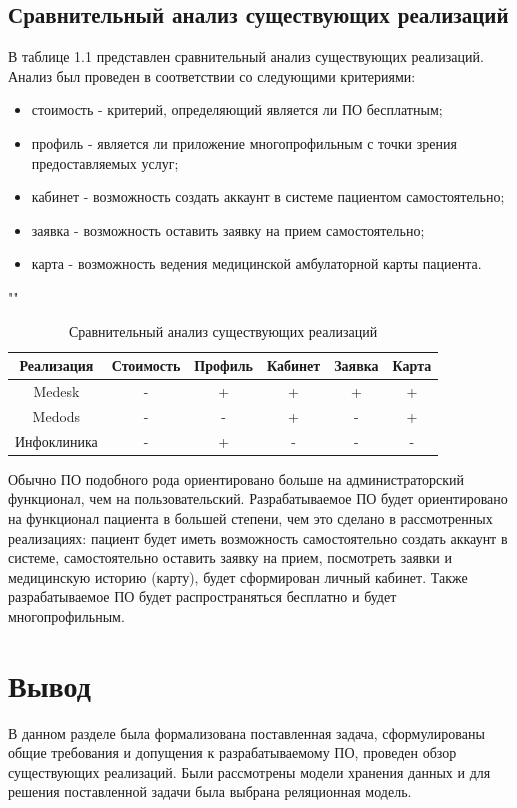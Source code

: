 \subsection*{Сравнительный анализ существующих реализаций}

В таблице 1.1 представлен сравнительный анализ существующих реализаций. Анализ был проведен в соответствии со следующими критериями:

\begin{itemize}
    \item стоимость - критерий, определяющий является ли ПО бесплатным;
    \item профиль - является ли приложение многопрофильным с точки зрения предоставляемых услуг;
    \item кабинет - возможность создать аккаунт в системе пациентом самостоятельно;
    \item заявка - возможность оставить заявку на прием самостоятельно;
    \item карта - возможность ведения медицинской амбулаторной карты пациента.
\end{itemize}

\begin{table}[h!]
	\begin{center}
	    \caption{Сравнительный анализ существующих реализаций}
		""\newline
		\begin{tabular}{|c|c|c|c|c|c|}
			\hline
			Реализация & Стоимость & Профиль & Кабинет & Заявка & Карта\\[0.8ex]
			\hline
			Medesk & - & + & + & + & + \\
			\hline
			Medods & - & - & + & - & + \\
			\hline
			Инфоклиника & - & + & - & - & - \\
			\hline
		\end{tabular}
	\end{center}
\end{table}	

Обычно ПО подобного рода ориентировано больше на администраторский функционал, чем на пользовательский. Разрабатываемое ПО будет ориентировано на функционал пациента в большей степени, чем это сделано в рассмотренных реализациях: пациент будет иметь возможность самостоятельно создать аккаунт в системе, самостоятельно оставить заявку на прием, посмотреть заявки и медицинскую историю (карту), будет сформирован личный кабинет. Также разрабатываемое ПО будет распространяться бесплатно и будет многопрофильным.

\section*{Вывод}

В данном разделе была формализована поставленная задача, сформулированы общие требования и допущения к разрабатываемому ПО, проведен обзор существующих реализаций. Были рассмотрены модели хранения данных и для решения поставленной задачи была выбрана реляционная модель.	